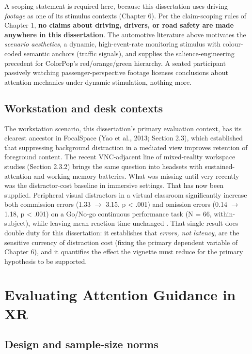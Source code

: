 A scoping statement is required here, because this dissertation uses driving \textit{footage} as one of its
stimulus contexts (Chapter 6). Per the claim-scoping rules of Chapter 1, \textbf{no claims about
driving, drivers, or road safety are made anywhere in this dissertation}. The
automotive literature above motivates the \textit{scenario aesthetics}, a dynamic, high-event-rate
monitoring stimulus with colour-coded semantic anchors (traffic signals), and supplies the
salience-engineering precedent for ColorPop's red/orange/green hierarchy. A seated participant
passively watching passenger-perspective footage licenses conclusions about attention mechanics
under dynamic stimulation, nothing more.

\subsection{Workstation and desk contexts}

The workstation scenario, this dissertation's primary evaluation context, has its clearest
ancestor in FocalSpace (Yao et al., 2013; Section 2.3), which established that suppressing background
distraction in a mediated view improves retention of foreground content. The recent VNC-adjacent
line of mixed-reality workspace studies (Section 2.3.2) brings the same question into headsets with
sustained-attention and working-memory batteries. What was missing until very recently was the
distractor-cost baseline in immersive settings. That has now been supplied. Peripheral visual
distractors in a virtual classroom significantly increase both commission errors (1.33 $\rightarrow$ 3.15,
p < .001) and omission errors (0.14 $\rightarrow$ 1.18, p < .001) on a Go/No-go continuous performance task
(N = 66, within-subject), while leaving mean reaction time unchanged \citep{ai2025}. That single result
does double duty for this dissertation: it establishes that \textit{errors, not latency}, are the sensitive
currency of distraction cost (fixing the primary dependent variable of Chapter 6), and it quantifies
the effect the vignette must reduce for the primary hypothesis to be supported.

\section{Evaluating Attention Guidance in XR}

\subsection{Design and sample-size norms}

